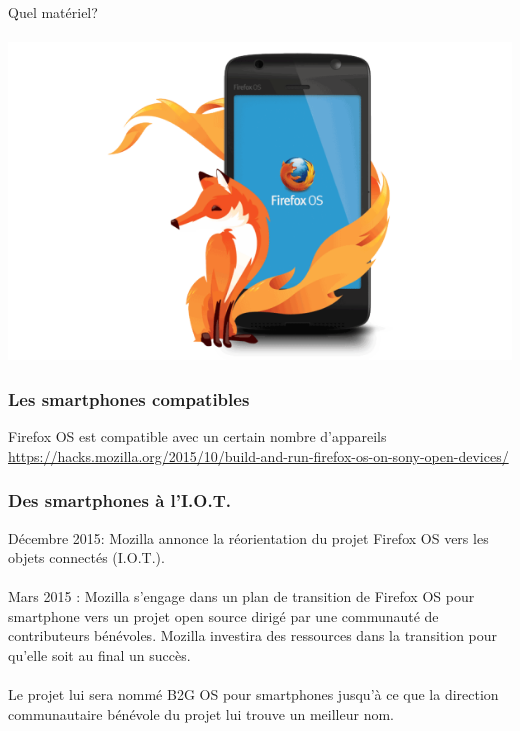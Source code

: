 \documentclass{beamer}
\begin{document}
\begin{frame}
\begin{center}
\Huge{Quel matériel?}
\\~\\
\includegraphics[scale=0.3]{./images/FirefoxOS-logo_610x385.png}
\end{center}
\end{frame}
\begin{frame}
\frametitle{Les smartphones compatibles}
\begin{block}{Firefox OS est compatible avec un certain nombre d'appareils}
\\
\url{https://hacks.mozilla.org/2015/10/build-and-run-firefox-os-on-sony-open-devices/}
\end{block} 
\end{frame}

\begin{frame}
\frametitle{Des smartphones à l'I.O.T.}
Décembre 2015: Mozilla annonce la réorientation du projet Firefox OS vers les objets connectés (I.O.T.).
\\~\\
Mars 2015 : Mozilla s’engage dans un plan de transition de Firefox OS pour smartphone vers un projet open source dirigé par une communauté de contributeurs bénévoles. Mozilla investira des ressources dans la transition pour qu’elle soit au final un succès.
\\~\\
Le projet lui sera nommé B2G OS pour smartphones jusqu’à ce que la direction communautaire bénévole du projet lui trouve un meilleur nom.
\end{frame}
\end{document}
